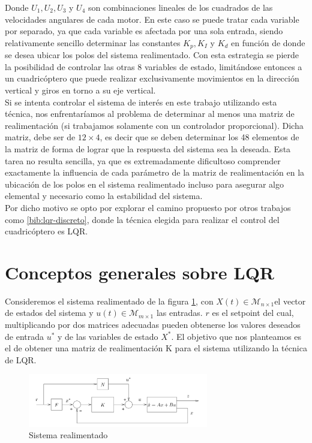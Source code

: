 \documentclass[main]{subfiles}
\begin{document}
Donde $U_1, U_2, U_3$ y $U_4$ son combinaciones lineales de los cuadrados de las velocidades angulares de cada motor. En este caso se puede tratar cada variable por separado, ya que cada variable es afectada por una sola entrada, siendo relativamente sencillo determinar las constantes $K_p, K_I$ y $K_d$ en funci\'on de donde se desea ubicar los polos del sistema realimentado. Con esta estrategia se pierde la posibilidad de controlar las otras 8 variables de estado, limit\'andose entonces a un cuadric\'optero que puede realizar exclusivamente movimientos en la direcci\'on vertical y giros en torno a su eje vertical.\\

Si se intenta controlar el sistema de inter\'es en este trabajo utilizando esta t\'ecnica, nos enfrentar\'iamos al problema de determinar al menos una matriz de realimentaci\'on (si trabajamos solamente con un controlador proporcional). Dicha matriz, debe ser de $12\times4$, es decir que se deben determinar los 48 elementos de la matriz de forma de lograr que la respuesta del sistema sea la deseada. Esta tarea no resulta sencilla, ya que es extremadamente dificultoso comprender exactamente la influencia de cada par\'ametro de la matriz de realimentaci\'on en la ubicaci\'on de los polos en el sistema realimentado incluso para asegurar algo elemental y necesario como la estabilidad del sistema.\\

Por dicho motivo se opto por explorar el camino propuesto por otros trabajos como \ref{bib:lqr-discreto}, donde la t\'ecnica elegida para realizar el control del cuadric\'optero es LQR.


\section{Conceptos generales sobre LQR}

Consideremos el sistema realimentado de la figura \ref{fig:bloque}, con $X(t)\in \mathcal{M}_{n\times1}$el vector de estados del sistema y $u(t)\in \mathcal{M}_{m\times1}$ las entradas. $r$ es el setpoint del cual, multiplicando por dos matrices adecuadas pueden obtenerse los valores deseados de entrada $u^*$ y de las variables de estado $X^*$. El objetivo que nos planteamos es el de obtener una matriz de realimentaci\'on K para el sistema utilizando la t\'ecnica de LQR. 

     
\begin{figure}
	\centering
	\includegraphics[width=0.7\textwidth]{./pics_control/bloque.pdf}
	\caption{Sistema realimentado}
	\label{fig:bloque}
\end{figure}
 
\end{document}
